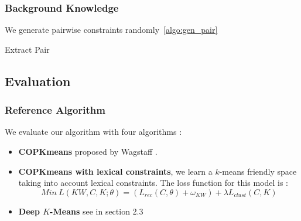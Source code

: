 \subsubsection{Background Knowledge}
We generate pairwise constraints randomly~\ref{algo:gen_pair}
\begin{algorithm}[!h]
  \caption{\label{algo:gen_pair}Extract Pair}
\end{algorithm}
\subsection{Evaluation}
\subsubsection{Reference Algorithm}
We evaluate our algorithm with four algorithms :
\begin{itemize}
\item \textbf{COPKmeans} proposed by Wagstaff \cite{Wagstaff:2001:CKC:645530.655669}.
\item \textbf{COPKmeans with lexical constraints}, we learn a $k$-means
  friendly space taking into account lexical constraints. The loss
  function for this model is :
  \begin{equation}
  Min~L(KW, C, K; \theta) = (L_{rec}(C, \theta) + \omega_{KW} )+
  \lambda L_{clust}(C,K)
  \end{equation}
\item \textbf{Deep $K$-Means} see in section 2.3
\end{itemize}
